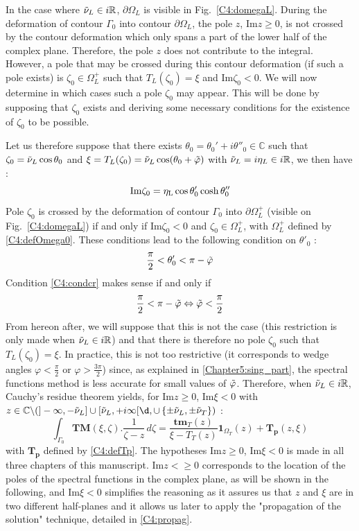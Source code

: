 In the case where $\tilde{\nu}_L \in i\mathbb{R}$, $\partial \Omega_L$ is visible in Fig.~\ref{C4:domegaL}. During the deformation of contour $\Gamma_0$ into contour $\partial\Omega_L$, the pole $z$, Im$z\geq 0$, is not crossed by the contour deformation which only spans a part of the lower half of the complex plane. Therefore, the pole $z$ does not contribute to the integral. However, a pole that may be crossed during this contour deformation (if such a pole exists) is $\zeta_0 \in \Omega_L^+$ such that $T_L(\zeta_0)=\xi$ and Im$\zeta_0<0$. We will now determine in which cases such a pole $\zeta_0$ may appear. This will be done by supposing that $\zeta_0$ exists and deriving some necessary conditions for the existence of $\zeta_0$ to be possible. 

Let us therefore suppose that there exists $\theta_0=\theta_0'+i\theta''_0 \in \mathbb{C}$ such that $\zeta_0=\tilde{\nu}_L\cos\theta_0$ and $\xi=T_L(\zeta_0)=\tilde{\nu}_L\cos(\theta_0+\tilde{\varphi})$ with $\tilde{\nu}_L=i\eta_L \in i\mathbb{R}$, we then have :
\begin{equation}
\rm Im \zeta_0=\eta_L\cos\theta_0'\cosh\theta_0''  
\end{equation}
Pole $\zeta_0$ is crossed by the deformation of contour $\Gamma_0$ into $\partial \Omega_L^+$ (visible on Fig.~\ref{C4:domegaL}) if and only if Im$\zeta_0<0$ and $\zeta_0 \in \Omega_L^+$, with $\Omega_L^+$ defined by \eqref{C4:defOmega0}. These conditions lead to the following condition on $\theta'_0$ :
\begin{equation}
\dfrac{\pi}{2}<\theta_0'<\pi-\tilde{\varphi}
\label{C4:condcr}
\end{equation}
Condition \eqref{C4:condcr} makes sense if and only if
\begin{equation}
\dfrac{\pi}{2}<\pi-\tilde{\varphi} \Leftrightarrow \tilde{\varphi}<\dfrac{\pi}{2}
\end{equation}
From hereon after, we will suppose that this is not the case (this restriction is only made when $\tilde{\nu}_L \in i\mathbb{R}$) and that there is therefore no pole $\zeta_0$ such that $T_L(\zeta_0)=\xi$. In practice, this is not too restrictive (it corresponds to wedge angles $\varphi<\frac{\pi}{2}$ or $\varphi>\frac{3\pi}{2}$) since, as explained in \ref{Chapter5:sing_part}, the spectral functions method is less accurate for small values of $\tilde{\varphi}$. Therefore, when $\tilde{\nu}_L \in i\mathbb{R}$, Cauchy's residue theorem yields, for Im$z\geq 0$, Im$\xi <0 $ with $z\in \mathbb{C} \backslash ( \rbrack - \infty, -\nuti_L \rbrack\cup \lbrack \nuti_L,+i\infty\lbrack \d, \cup \, \{\pm\tilde{\nu}_L,\pm\tilde{\nu}_T \})$ :
\begin{equation}
\int_{\Gamma_0} \textbf{TM}(\xi,\zeta).\frac{1}{\zeta-z}\,d\zeta = \frac{\textbf{tm}_T(z)}{\xi-T_T(z)}\textbf{1}_{\Omega_T}(z)+\mathbf{T_p}(z,\xi)
\label{C4:GaussTMcr}
\end{equation}
with $\mathbf{T_p}$ defined by \eqref{C4:defTp}. The hypotheses Im$z\geq 0$, Im$\xi <0 $ is made in all three chapters of this manuscript. Im$z<\geq0$ corresponds to the location of the poles of the spectral functions in the complex plane, as will be shown in the following, and Im$\xi<0$ simplifies the reasoning as it assures us that $z$ and $\xi$ are in two different half-planes and it allows us later to apply the "propagation of the solution" technique, detailed in \ref{C4:propag}.


